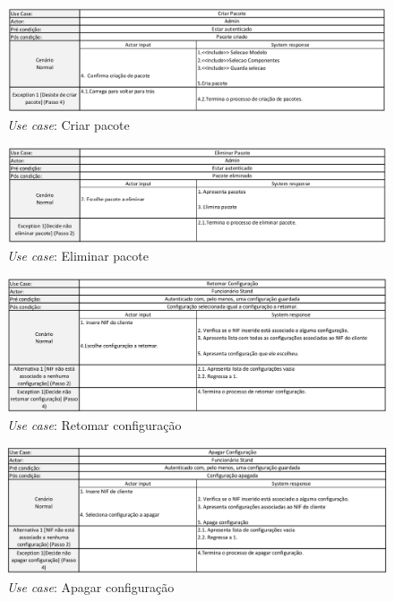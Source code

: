 \begin{figure}[ht]
    \centering
    \includegraphics[width=\textwidth]{analise_de_requisitos/img/use_cases/criar_pacote.png}
    \caption{\textit{Use case}: Criar pacote}
    \label{fig:uc_criar_pacote}
\end{figure}

\begin{figure}[ht]
    \centering
    \includegraphics[width=\textwidth]{analise_de_requisitos/img/use_cases/eliminar_pacote.png}
    \caption{\textit{Use case}: Eliminar pacote}
    \label{fig:uc_eliminar_pacote}
\end{figure}

\begin{figure}[ht]
    \centering
    \includegraphics[width=\textwidth]{analise_de_requisitos/img/use_cases/retomar_configuracao.png}
    \caption{\textit{Use case}: Retomar configuração}
    \label{fig:uc_retormar_configuracao}
\end{figure}

\begin{figure}[ht]
    \centering
    \includegraphics[width=\textwidth]{analise_de_requisitos/img/use_cases/apagar_configuracao.png}
    \caption{\textit{Use case}: Apagar configuração}
    \label{fig:uc_apagar_configuracao}
\end{figure}

